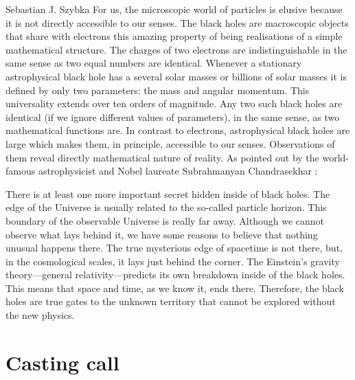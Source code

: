 \begin{artengenv}{Sebastian J. Szybka}
For us, the microscopic world of particles is elusive because it is not directly accessible to our senses.  The black holes are macroscopic objects that share with electrons this amazing property of being realisations of a simple mathematical structure. The charges of two electrons are indistinguishable in the same sense as two equal numbers are identical. Whenever a stationary astrophysical black hole has a several solar masses or billions of solar masses it is defined by only two parameters: the mass and angular momentum. This universality extends over ten orders of magnitude. Any two such black holes are identical (if we ignore different values of parameters), in the same sense, as two mathematical functions are. In contrast to electrons, astrophysical black holes are large which makes them, in principle, accessible to our senses. Observations of them reveal directly mathematical nature of reality. As pointed out by the world-famous astrophysicist and Nobel laureate Subrahmanyan Chandrasekhar \parencite*{chandrasekhar_shakespeare_1975}:


There is at least one more important secret hidden inside of black holes. The edge of the Universe is usually related to the so-called particle horizon. This boundary of the observable Universe is really far away. Although we cannot observe what lays behind it, we have some reasons to believe that nothing unusual happens there. The true mysterious edge of spacetime is not there, but, in the cosmological scales, it lays just behind the corner. The Einstein's gravity theory---general relativity---predicts its own breakdown inside of the black holes. This means that space and time, as we know it, ends there. Therefore, the black holes are true gates to the unknown territory that cannot be explored without the new physics.

\section{Casting call}


\end{artengenv}
